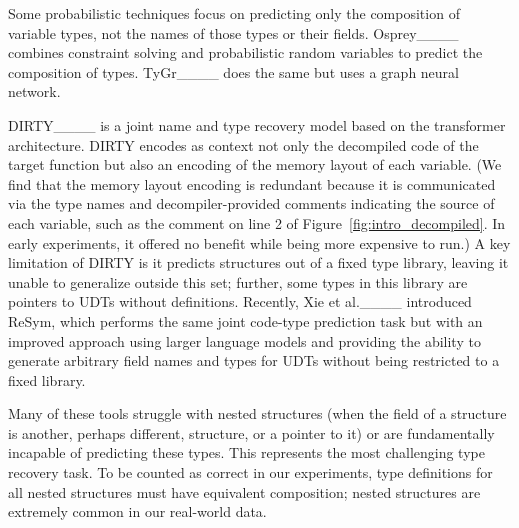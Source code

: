 Some probabilistic techniques focus on predicting only the composition of variable types, not the names of those types or their fields.
Osprey____ combines constraint solving and probabilistic random variables to predict the composition of types.
TyGr____ does the same but uses a graph neural network.

DIRTY____ is a joint name and type recovery model based on the transformer architecture.
DIRTY encodes as context not only the decompiled code of the target function but also an encoding of the memory layout of each variable.
(We find that the memory layout encoding is redundant because it is communicated via the type names and decompiler-provided comments indicating the source of each variable, such as the  comment on line 2 of Figure~\ref{fig:intro_decompiled}. In early experiments, it offered no benefit while being more expensive to run.)
A key limitation of DIRTY is it predicts structures out of a fixed type library, leaving it unable to generalize outside this set; further, some types in this library are pointers to UDTs without definitions.
Recently, Xie et al.____ introduced ReSym, which performs the same joint code-type prediction task but with an improved approach using larger language models and providing the ability to generate arbitrary field names and types for UDTs without being restricted to a fixed library.

Many of these tools struggle with nested structures (when the field of a structure is another, perhaps different, structure, or a pointer to it) or are fundamentally incapable of predicting these types.
This represents the most challenging type recovery task.
To be counted as correct in our experiments, type definitions for all nested structures must have equivalent composition; nested structures are extremely common in our real-world data.